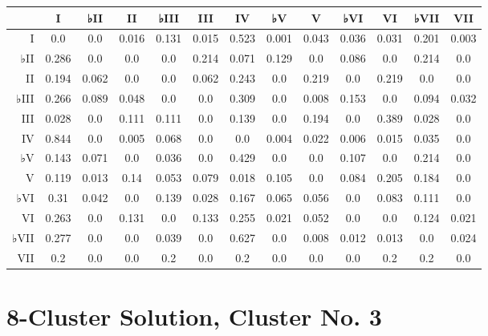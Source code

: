 \begin{table}[htbp]
\begin{minipage}{\linewidth}
\setlength{\tymax}{0.5\linewidth}
\centering
\small
\begin{tabulary}{\textwidth}{@{}RCCCCCCCCCCCC@{}} \toprule
&I&♭II&II&♭III&III&IV&♭V&V&♭VI&VI&♭VII&VII\\
\midrule
I&0.0&0.0&0.016&0.131&0.015&0.523&0.001&0.043&0.036&0.031&0.201&0.003\\
♭II&0.286&0.0&0.0&0.0&0.214&0.071&0.129&0.0&0.086&0.0&0.214&0.0\\
II&0.194&0.062&0.0&0.0&0.062&0.243&0.0&0.219&0.0&0.219&0.0&0.0\\
♭III&0.266&0.089&0.048&0.0&0.0&0.309&0.0&0.008&0.153&0.0&0.094&0.032\\
III&0.028&0.0&0.111&0.111&0.0&0.139&0.0&0.194&0.0&0.389&0.028&0.0\\
IV&0.844&0.0&0.005&0.068&0.0&0.0&0.004&0.022&0.006&0.015&0.035&0.0\\
♭V&0.143&0.071&0.0&0.036&0.0&0.429&0.0&0.0&0.107&0.0&0.214&0.0\\
V&0.119&0.013&0.14&0.053&0.079&0.018&0.105&0.0&0.084&0.205&0.184&0.0\\
♭VI&0.31&0.042&0.0&0.139&0.028&0.167&0.065&0.056&0.0&0.083&0.111&0.0\\
VI&0.263&0.0&0.131&0.0&0.133&0.255&0.021&0.052&0.0&0.0&0.124&0.021\\
♭VII&0.277&0.0&0.0&0.039&0.0&0.627&0.0&0.008&0.012&0.013&0.0&0.024\\
VII&0.2&0.0&0.0&0.2&0.0&0.2&0.0&0.0&0.0&0.2&0.2&0.0\\

\bottomrule

\end{tabulary}
\end{minipage}
\end{table}

\section{8-Cluster Solution, Cluster No. 3}
\label{8-clustersolutionclusterno.3}


